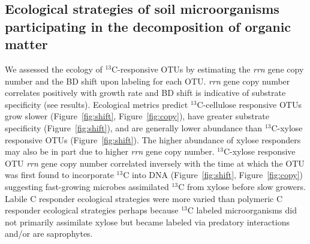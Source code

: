 \subsection{Ecological strategies of soil microorganisms participating in the
decomposition of organic matter}
We assessed the ecology of $^{13}$C-responsive OTUs by estimating the
\textit{rrn} gene copy number and the BD shift upon labeling for each OTU.
\textit{rrn} gene copy number correlates positively with growth rate
\citep{11125085} and BD shift is indicative of substrate specificity (see
results). Ecological metrics predict $^{13}$C-cellulose responsive OTUs grow
slower (Figure~\ref{fig:shift}, Figure~\ref{fig:copy}), have greater substrate
specificity (Figure~\ref{fig:shift}), and are generally lower abundance than
$^{13}$C-xylose responsive OTUs (Figure~\ref{fig:shift}). The higher abundance
of xylose responders may also be in part due to higher \textit{rrn} gene copy
number. $^{13}$C-xylose responsive OTU \textit{rrn} gene copy number correlated
inversely with the time at which the OTU was first found to incorporate
$^{13}$C into DNA (Figure~\ref{fig:shift}, Figure~\ref{fig:copy}) suggesting
fast-growing microbes assimilated $^{13}$C from xylose before slow growers.
Labile C responder ecological strategies were more varied than polymeric
C responder ecological strategies perhaps because $^{13}$C labeled
microorganisms did not primarily assimilate xylose but became labeled via
predatory interactions and/or are saprophytes. 

